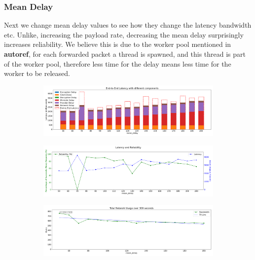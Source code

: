 \documentclass[a4paper,11pt,oneside]{report}
\begin{document}
\subsubsection{Mean Delay}
Next we change mean delay values to see how they change the latency bandwidth etc. Unlike, increasing the payload rate, decreasing the mean delay surprisingly increases reliability. We believe this is due to the worker pool mentioned in \textbf{autoref}, for each forwarded packet a thread is spawned, and this thread is part of the worker pool, therefore less time for the delay means less time for the worker to be released.

\begin{figure}[htbp]
    \centering
    \begin{subfigure}{\textwidth}
        \centering
        \includegraphics[width=\textwidth]{plots/delays_latency_components.png}
        \caption{}
        \label{fig:lambdas_latency}
    \end{subfigure}
    \hfill
    \centering
    \begin{subfigure}{\textwidth}
        \centering
        \includegraphics[width=\textwidth]{plots/delays_reliability_latency.png}
        \caption{}
        \label{fig:lambdas_realibility}
    \end{subfigure}
    \hfill
    \begin{subfigure}{\textwidth}
        \centering
        \includegraphics[width=\textwidth]{plots/delays_bandwidth.png}

\end{subfigure}
\end{figure}
\end{document}
